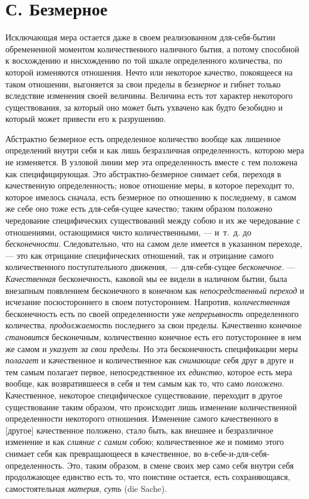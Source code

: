\section[С. Безмерное]{С. Безмерное}
Исключающая мера остается даже в своем
реализованном для-себя-бытии обремененной моментом количественного
наличного бытия, а потому способной к восхождению и нисхождению по той
шкале определенного количества, по которой изменяются отношения. Нечто или
некоторое качество, покоящееся на таком отношении, выгоняется за свои
пределы в {\em безмерное} и гибнет только вследствие
изменения своей величины. Величина есть тот характер некоторого
существования, за который оно может быть ухвачено как будто безобидно и
который может привести его к разрушению.

Абстрактно безмерное есть определенное количество вообще как лишенное
определений внутри себя и как лишь безразличная определенность, которою
мера не изменяется. В узловой линии мер эта определенность вместе с тем
положена как специфицирующая. Это абстрактно-безмерное снимает себя,
переходя в качественную определенность; новое отношение меры, в которое
переходит то, которое имелось сначала, есть безмерное по отношению к
последнему, в самом же себе оно тоже есть для-себя-сущее качество; таким
образом положено чередование специфических существований между собою и их
же чередование с отношениями, остающимися чисто количественными, — и~т.~д.
до {\em бесконечности}. Следовательно, что на самом
деле имеется в указанном переходе, — это как отрицание специфических
отношений, так и отрицание самого количественного поступательного движения,
— для-себя-сущее {\em бесконечное}. —
{\em Качественная} бесконечность, каковой мы ее видели
в наличном бытии, была внезапным появлением бесконечного в конечном как
{\em непосредственный переход} и исчезание
посюстороннего в своем потустороннем. Напротив,
{\em количественная} бесконечность есть по своей
определенности уже {\em непрерывность} определенного
количества, {\em продолжаемость} последнего за свои
пределы. Качественно конечное {\em становится}
бесконечным, количественно конечное есть его потустороннее в нем же самом и
{\em указует за свои пределы}. Но эта бесконечность
спецификации меры {\em полагает} и качественное и
количественное как {\em снимающие} себя друг в друге и
тем самым полагает первое, непосредственное их
{\em единство}, которое есть мера вообще, как
возвратившееся в себя и тем самым как то, что само
{\em положено}. Качественное, некоторое специфическое
существование, переходит в другое существование таким образом, что
происходит лишь изменение количественной определенности некоторого
отношения. Изменение самого качественного в [другое] качественное положено,
стало быть, как внешнее и безразличное изменение и как
{\em слияние с самим собою}; количественное же и помимо
этого снимает себя как превращающееся в качественное, во
в-себе-и-для-себя-определенность. Это, таким образом, в смене своих мер
само себя внутри себя продолжающее единство есть то, что поистине остается,
есть сохраняющаяся, самостоятельная {\em материя},
{\em суть} (die Sache).

